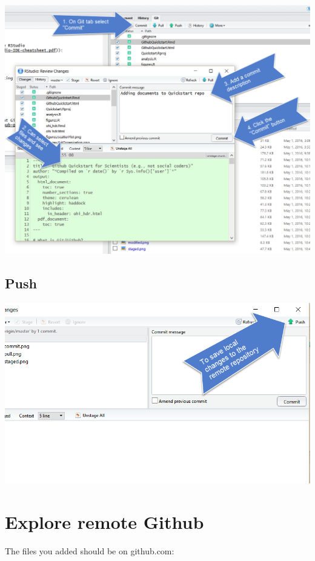 \documentclass[]{book}
\theoremstyle{definition}
\theoremstyle{definition}
\theoremstyle{definition}
\theoremstyle{remark}
\begin{document}
\includegraphics{img/commit.png}

\subsection{Push}\label{push}

\includegraphics{img/push.png}

\section{Explore remote Github}\label{explore-remote-github}

The files you added should be on github.com:
\end{document}
